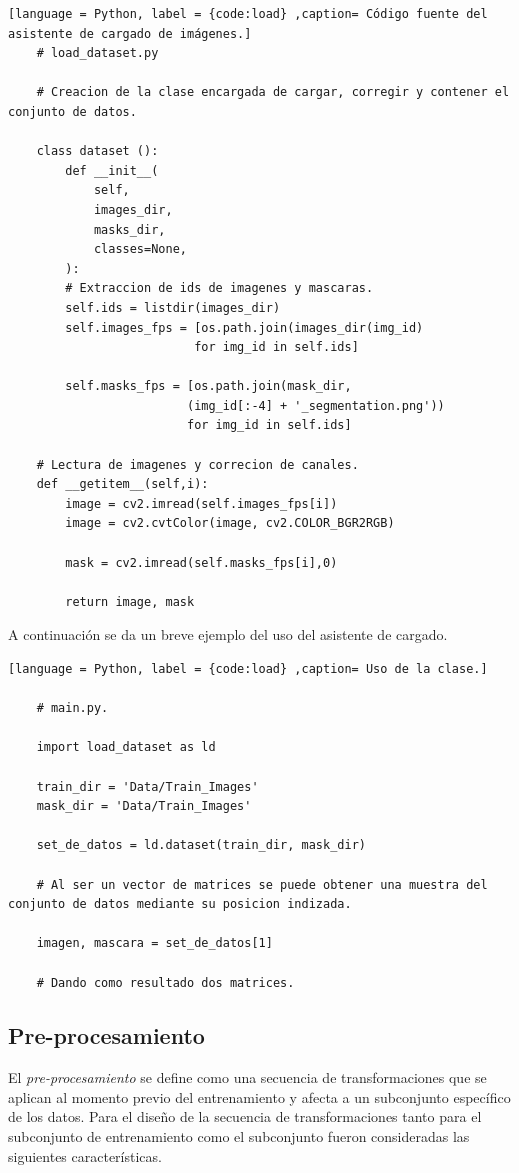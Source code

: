 \lstset{style=pystyle}

\begin{lstlisting}[language = Python, label = {code:load} ,caption= Código fuente del asistente de cargado de imágenes.]
    # load_dataset.py

    # Creacion de la clase encargada de cargar, corregir y contener el conjunto de datos.

    class dataset ():
        def __init__(
            self,
            images_dir,
            masks_dir,
            classes=None,
        ):
        # Extraccion de ids de imagenes y mascaras.
        self.ids = listdir(images_dir)
        self.images_fps = [os.path.join(images_dir(img_id)
                          for img_id in self.ids]

        self.masks_fps = [os.path.join(mask_dir,
                         (img_id[:-4] + '_segmentation.png'))
                         for img_id in self.ids]

    # Lectura de imagenes y correcion de canales.
    def __getitem__(self,i):
        image = cv2.imread(self.images_fps[i])
        image = cv2.cvtColor(image, cv2.COLOR_BGR2RGB)

        mask = cv2.imread(self.masks_fps[i],0)

        return image, mask
\end{lstlisting}

A continuación se da un breve ejemplo del uso del asistente de cargado.

\begin{lstlisting}[language = Python, label = {code:load} ,caption= Uso de la clase.]

    # main.py.
    
    import load_dataset as ld 

    train_dir = 'Data/Train_Images'
    mask_dir = 'Data/Train_Images'

    set_de_datos = ld.dataset(train_dir, mask_dir)

    # Al ser un vector de matrices se puede obtener una muestra del conjunto de datos mediante su posicion indizada.

    imagen, mascara = set_de_datos[1]

    # Dando como resultado dos matrices.

\end{lstlisting}


\subsection{Pre-procesamiento}
El \emph{pre-procesamiento} se define como una secuencia de transformaciones que se aplican al momento previo del entrenamiento y afecta a un subconjunto específico de los datos. Para el diseño de la secuencia de transformaciones tanto para el subconjunto de entrenamiento como el subconjunto fueron consideradas las siguientes características.


